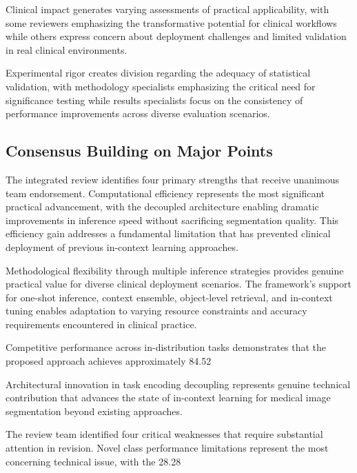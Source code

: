 Clinical impact generates varying assessments of practical applicability, with some reviewers emphasizing the transformative potential for clinical workflows while others express concern about deployment challenges and limited validation in real clinical environments.

Experimental rigor creates division regarding the adequacy of statistical validation, with methodology specialists emphasizing the critical need for significance testing while results specialists focus on the consistency of performance improvements across diverse evaluation scenarios.

\subsection*{Consensus Building on Major Points}
The integrated review identifies four primary strengths that receive unanimous team endorsement. Computational efficiency represents the most significant practical advancement, with the decoupled architecture enabling dramatic improvements in inference speed without sacrificing segmentation quality. This efficiency gain addresses a fundamental limitation that has prevented clinical deployment of previous in-context learning approaches.

Methodological flexibility through multiple inference strategies provides genuine practical value for diverse clinical deployment scenarios. The framework's support for one-shot inference, context ensemble, object-level retrieval, and in-context tuning enables adaptation to varying resource constraints and accuracy requirements encountered in clinical practice.

Competitive performance across in-distribution tasks demonstrates that the proposed approach achieves approximately 84.52%

Architectural innovation in task encoding decoupling represents genuine technical contribution that advances the state of in-context learning for medical image segmentation beyond existing approaches.

The review team identified four critical weaknesses that require substantial attention in revision. Novel class performance limitations represent the most concerning technical issue, with the 28.28%

